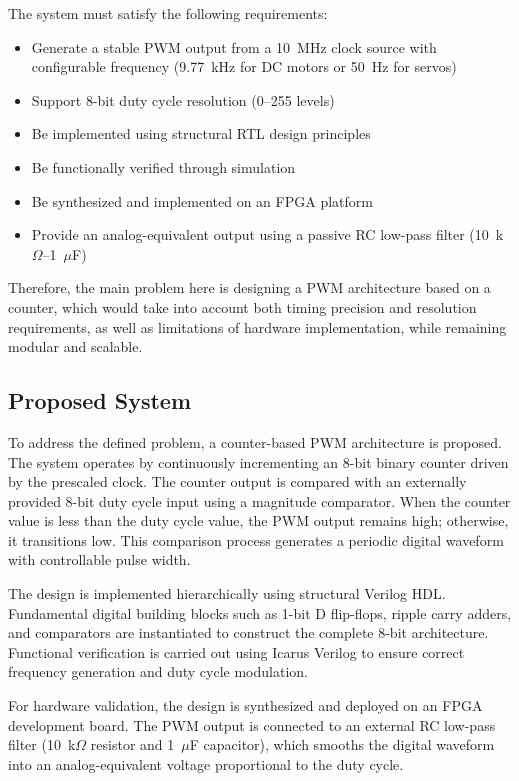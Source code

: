 \documentclass[12pt,a4paper]{article}
\begin{document}
The system must satisfy the following requirements:
\begin{itemize}
\item Generate a stable PWM output from a 10~MHz clock source with configurable frequency (9.77~kHz for DC motors or 50~Hz for servos)
\item Support 8-bit duty cycle resolution (0--255 levels)
\item Be implemented using structural RTL design principles
\item Be functionally verified through simulation
\item Be synthesized and implemented on an FPGA platform
\item Provide an analog-equivalent output using a passive RC low-pass filter (10~k$\Omega$--1~$\mu$F)
\end{itemize}

Therefore, the main problem here is designing a PWM architecture based on a counter, which would take into account both timing precision and resolution requirements, as well as limitations of hardware implementation, while remaining modular and scalable.

\subsection{Proposed System}
To address the defined problem, a counter-based PWM architecture is proposed. The system operates by continuously incrementing an 8-bit binary counter driven by the prescaled clock. The counter output is compared with an externally provided 8-bit duty cycle input using a magnitude comparator. When the counter value is less than the duty cycle value, the PWM output remains high; otherwise, it transitions low. This comparison process generates a periodic digital waveform with controllable pulse width.

The design is implemented hierarchically using structural Verilog HDL. Fundamental digital building blocks such as 1-bit D flip-flops, ripple carry adders, and comparators are instantiated to construct the complete 8-bit architecture. Functional verification is carried out using Icarus Verilog to ensure correct frequency generation and duty cycle modulation.

For hardware validation, the design is synthesized and deployed on an FPGA development board. The PWM output is connected to an external RC low-pass filter (10~k$\Omega$ resistor and 1~$\mu$F capacitor), which smooths the digital waveform into an analog-equivalent voltage proportional to the duty cycle.
\end{document}
